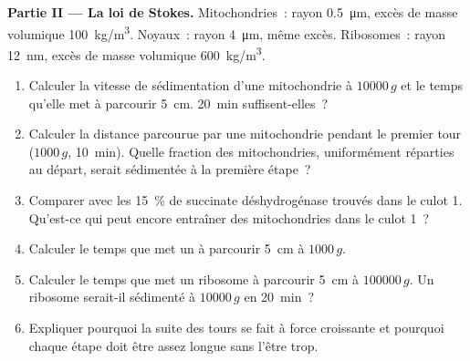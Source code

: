 \begin{problem}
\medskip
\noindent\textbf{Partie II --- La loi de Stokes.}
Mitochondries~: rayon \qty{0.5}{\micro m}, excès de masse volumique
\qty{100}{kg/m^3}. Noyaux~: rayon \qty{4}{\micro m}, même excès.
Ribosomes~: rayon \qty{12}{nm}, excès de masse volumique
\qty{600}{kg/m^3}.
\begin{enumerate}[resume]
  \item Calculer la vitesse de sédimentation d'une mitochondrie à
        $\num{10000}\,g$ et le temps qu'elle met à parcourir
        \qty{5}{cm}. \qty{20}{min} suffisent-elles~?
  \item Calculer la distance parcourue par une mitochondrie pendant le
        premier tour ($1000\,g$, \qty{10}{min}). Quelle fraction des
        mitochondries, uniformément réparties au départ, serait
        sédimentée à la première étape~?
  \item Comparer avec les \qty{15}{\%} de succinate déshydrogénase
        trouvés dans le culot 1. Qu'est-ce qui peut encore entraîner des
        mitochondries dans le culot 1~?
  \item Calculer le temps que met un  à parcourir \qty{5}{cm} à
        $1000\,g$.
  \item Calculer le temps que met un ribosome à parcourir \qty{5}{cm} à
        $\num{100000}\,g$. Un ribosome serait-il sédimenté à
        $\num{10000}\,g$ en \qty{20}{min}~?
  \item Expliquer pourquoi la suite des tours se fait à force croissante
        et pourquoi chaque étape doit être assez longue sans l'être trop.
\end{enumerate}


\end{problem}

